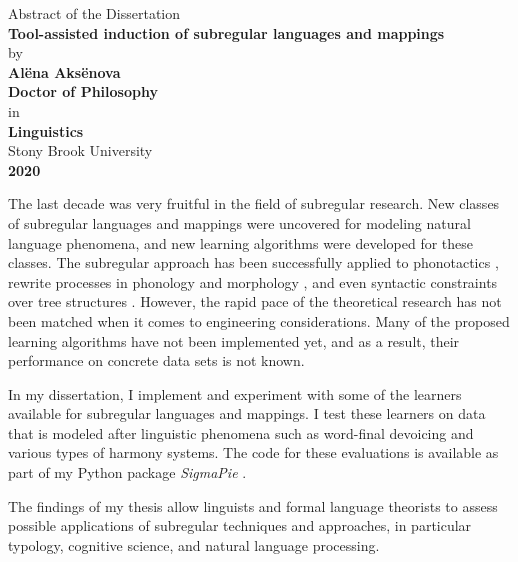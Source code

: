 \begin{center}
Abstract of the Dissertation \\ \vspace{1em}
\textbf{Tool-assisted induction of subregular languages and mappings} \\ \vspace{1em}
by \\ \vspace{1em}
\textbf{Al\"ena Aks\"enova} \\ \vspace{1em}
\textbf{Doctor of Philosophy} \\ \vspace{1em}
in \\ \vspace{1em}
\textbf{Linguistics} \\ \vspace{1em}
Stony Brook University \\ \vspace{1em}
\textbf{2020} \\ \vspace{3em}
\end{center}



The last decade was very fruitful in the field of subregular research.
New classes of subregular languages and mappings were uncovered for modeling natural language phenomena, and new learning algorithms were developed for these classes.
The subregular approach has been successfully applied to phonotactics \citep{Heinz10ldp}, rewrite processes in phonology and morphology \citep{Chandlee2014}, and even syntactic constraints over tree structures \citep{Graf18CLS}.
However, the rapid pace of the theoretical research has not been matched when it comes to engineering considerations.
Many of the proposed learning algorithms have not been implemented yet, and as a result, their performance on concrete data sets is not known.

In my dissertation, I implement and experiment with some of the learners available for subregular languages and mappings.
I test these learners on data that is modeled after linguistic phenomena such as word-final devoicing and various types of harmony systems.
The code for these evaluations is available as part of my Python package \emph{SigmaPie} \href{https://pypi.org/project/SigmaPie/}{\faCube} \citep{sigmapie}.

The findings of my thesis allow linguists and formal language theorists to assess possible applications of subregular techniques and approaches, in particular typology, cognitive science, and natural language processing.

\clearpage
\thispagestyle{plain}
\par{}